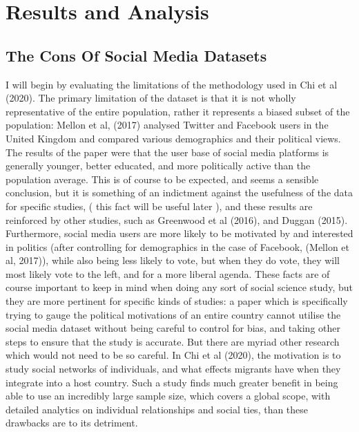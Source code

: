 \documentclass[12pt]{article}
\begin{document}
\section{Results and Analysis}

\subsection{The Cons Of Social Media Datasets}

I will begin by evaluating the limitations of the methodology used in Chi et al (2020). The 
primary limitation of the dataset is that it is not wholly representative of the entire 
population, rather it represents a biased subset of the population: Mellon et al, (2017)
analysed Twitter and Facebook users in the United Kingdom and compared various demographics 
and their political views. The results of the paper were that the user base of social 
media platforms is generally younger, better educated, and more politically active 
than the population average. This is of course to be expected, and seems a sensible conclusion, 
but it is something of an indictment against the usefulness of the data for specific studies, (
	this fact will be useful later
), and these results are reinforced by other studies, such as Greenwood et al (2016), and 
Duggan (2015). Furthermore, social media users are more likely to be motivated by and interested 
in politics (after controlling for demographics in the case of Facebook, (Mellon et al, 2017)),
while also being less likely to vote, but when they do vote, they will most likely vote to the 
left, and for a more liberal agenda. These facts are of course important to keep in mind 
when doing any sort of social science study, but they are more pertinent for specific kinds 
of studies: a paper which is specifically trying to gauge the political motivations of an 
entire country cannot utilise the social media dataset without being careful to control 
for bias, and taking other steps to ensure that the study is accurate. But there are myriad
other research which would not need to be so careful. In Chi et al (2020), the motivation 
is to study social networks of individuals, and what effects migrants have when they integrate 
into a host country. Such a study finds much greater benefit in being able to use an 
incredibly large sample size, which covers a global scope, with detailed analytics on 
individual relationships and social ties, than these drawbacks are to its detriment. 
\end{document}
